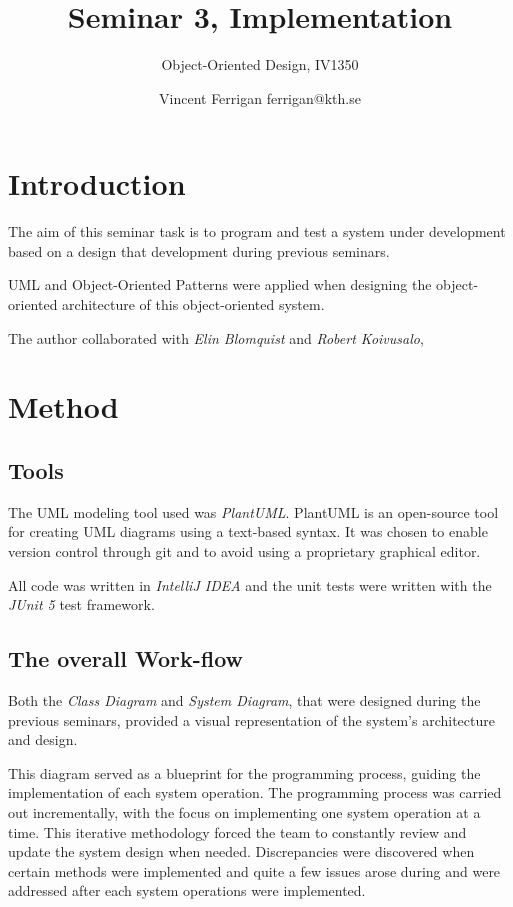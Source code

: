 \documentclass[a4paper]{scrreprt}
\title{Seminar 3, Implementation}
\subtitle{Object-Oriented Design, IV1350}
\author{Vincent Ferrigan ferrigan@kth.se}
\begin{document}
\maketitle

\tableofcontents %

\chapter{Introduction}
The aim of this seminar task is to %
program and test a system under development based on a design that development
during previous seminars.

UML and Object-Oriented Patterns were applied when designing the object-oriented
architecture of this object-oriented system.


The author collaborated with
\emph{Elin Blomquist} and \emph{Robert Koivusalo},



\chapter{Method}
\section*{Tools}
The UML modeling tool used was \emph{PlantUML}.
PlantUML is an open-source tool for creating UML diagrams using a text-based
syntax. It was chosen to enable version control through git and to avoid using a
proprietary graphical editor.

All code was written in \emph{IntelliJ IDEA} and the unit tests were written with the \emph{JUnit 5} test framework.

\section*{The overall Work-flow}
Both the \emph{Class Diagram} and \emph{System Diagram}, that were designed during the previous seminars,
provided a visual representation of the system's architecture and design.

This diagram served as a blueprint for the programming process,
guiding the implementation of each system operation.
The programming process was carried out incrementally,
with the focus on implementing one system operation at a time.
This iterative methodology forced the team to constantly review and
update the system design when needed.
Discrepancies were discovered when certain methods
were implemented  and
quite a few issues arose during and were addressed after each system operations
were implemented.
\end{document}
